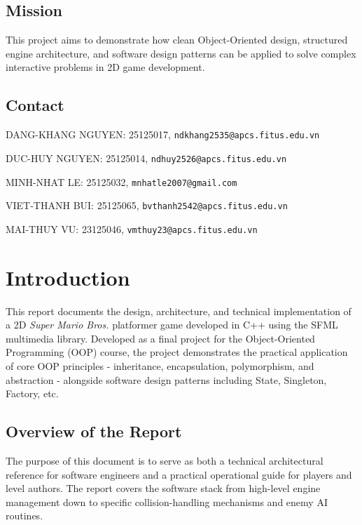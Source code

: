 \documentclass[12pt, a4paper]{article}
\begin{document}
\subsection*{Mission}
This project aims to demonstrate how clean Object-Oriented design, structured engine architecture, and software design patterns can be applied to solve complex interactive problems in 2D game development.

\subsection*{Contact}

DANG-KHANG NGUYEN: 25125017, \texttt{ndkhang2535@apcs.fitus.edu.vn}

DUC-HUY NGUYEN: 25125014, \texttt{ndhuy2526@apcs.fitus.edu.vn} 

MINH-NHAT LE: 25125032, \texttt{mnhatle2007@gmail.com} 

VIET-THANH BUI: 25125065, \texttt{bvthanh2542@apcs.fitus.edu.vn} 

MAI-THUY VU: 23125046, \texttt{vmthuy23@apcs.fitus.edu.vn}

\newpage

\tableofcontents

\newpage

\section{Introduction}

This report documents the design, architecture, and technical implementation of a 2D \textit{Super Mario Bros.} platformer game developed in C++ using the SFML multimedia library. Developed as a final project for the Object-Oriented Programming (OOP) course, the project demonstrates the practical application of core OOP principles - inheritance, encapsulation, polymorphism, and abstraction - alongside software design patterns including State, Singleton, Factory, etc.

\subsection*{Overview of the Report}
The purpose of this document is to serve as both a technical architectural reference for software engineers and a practical operational guide for players and level authors. The report covers the software stack from high-level engine management down to specific collision-handling mechanisms and enemy AI routines.
\end{document}
